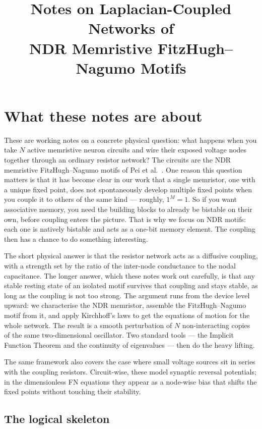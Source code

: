 \documentclass[11pt]{article}
\title{Notes on Laplacian-Coupled Networks of\\
NDR Memristive FitzHugh--Nagumo Motifs}
\author{}
\date{}
\begin{document}
\maketitle
\tableofcontents


\section{What these notes are about}

These are working notes on a concrete physical question: what happens
when you take $N$ active memristive neuron circuits and wire their
exposed voltage nodes together through an ordinary resistor network?
The circuits are the NDR memristive FitzHugh--Nagumo motifs of Pei et
al.~\cite{pei2025}. One reason this question matters is that it has become clear in
our work that a single memristor, one with a unique fixed point,
does not spontaneously develop multiple fixed points when you couple it
to others of the same kind --- roughly, $1^M = 1$. So if you want
associative memory, you need the building blocks to already be bistable
on their own, before coupling enters the picture. That is why we focus
on NDR motifs: each one is natively bistable and acts as a one-bit
memory element. The coupling then has a chance to do something
interesting.

The short physical answer is that the resistor network acts as a
diffusive coupling, with a strength set by the ratio of the inter-node
conductance to the nodal capacitance. The longer answer, which these
notes work out carefully, is that any stable resting state of an
isolated motif survives that coupling and stays stable, as long as the
coupling is not too strong. The argument runs from the device level
upward: we characterise the NDR memristor, assemble the FitzHugh--Nagumo
motif from it, and apply Kirchhoff's laws to get the equations of motion
for the whole network. The result is a smooth perturbation of $N$
non-interacting copies of the same two-dimensional oscillator. Two
standard tools --- the Implicit Function Theorem and the continuity of
eigenvalues --- then do the heavy lifting.

The same framework also covers the case where small voltage sources
sit in series with the coupling resistors. Circuit-wise, these
model synaptic reversal potentials; in the dimensionless FN equations
they appear as a node-wise bias that shifts the fixed points without
touching their stability.

\subsection*{The logical skeleton}
\end{document}
